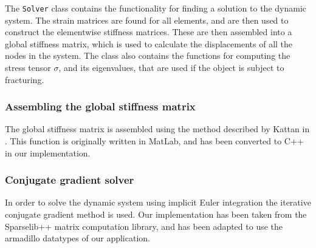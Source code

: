 The \texttt{Solver} class contains the functionality for finding a solution to the dynamic system. The strain matrices are found for all elements, and are then used to construct the elementwise stiffness matrices. These are then assembled into a global stiffness matrix, which is used to calculate the displacements of all the nodes in the system. The class also contains the functions for computing the stress tensor $\sigma$, and its eigenvalues, that are used if the object is subject to fracturing. 
\subsubsection{Assembling the global stiffness matrix}
The global stiffness matrix is assembled using the method described by Kattan in \cite{matlab}. This function is originally written in MatLab, and has been converted to C++ in our implementation. 
\subsubsection{Conjugate gradient solver}
In order to solve the dynamic system using implicit Euler integration the iterative conjugate gradient method is used. Our implementation has been taken from the Sparselib++ matrix computation library, and has been adapted to use the armadillo datatypes of our application. 
